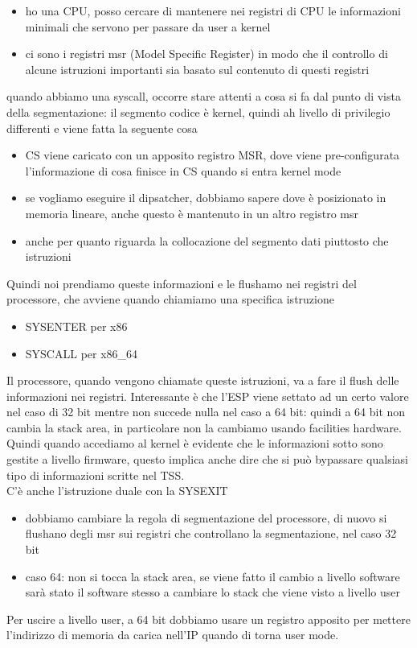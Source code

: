 \documentclass[12pt, oneside]{extbook}
\begin{document}
\begin{itemize}
\item ho una CPU, posso cercare di mantenere nei registri di CPU le informazioni minimali che servono per passare da user a kernel
\item ci sono i registri msr (Model Specific Register) in modo che il controllo di alcune istruzioni importanti sia basato sul contenuto di questi registri
\end{itemize}
quando abbiamo una syscall, occorre stare attenti a cosa si fa dal punto di vista della segmentazione: il segmento codice è kernel, quindi ah livello di privilegio differenti e viene fatta la seguente cosa
\begin{itemize}
\item CS viene caricato con un apposito registro MSR, dove viene pre-configurata l'informazione di cosa finisce in CS quando si entra kernel mode
\item se vogliamo eseguire il dipsatcher, dobbiamo sapere dove è posizionato in memoria lineare, anche questo è mantenuto in un altro registro msr
\item anche per quanto riguarda la collocazione del segmento dati piuttosto che istruzioni
\end{itemize}
Quindi noi prendiamo queste informazioni e le flushamo nei registri del processore, che avviene quando chiamiamo una specifica istruzione 
\begin{itemize}
\item SYSENTER per x86
\item SYSCALL per x86\_64
\end{itemize}
Il processore, quando vengono chiamate queste istruzioni, va a fare il flush delle informazioni nei registri. Interessante è che l'ESP viene settato ad un certo valore nel caso di 32 bit mentre non succede nulla nel caso a 64 bit: quindi a 64 bit non cambia la stack area, in particolare non la cambiamo usando facilities hardware. Quindi quando accediamo al kernel è evidente che le informazioni sotto sono gestite a livello firmware, questo implica anche dire che si può bypassare qualsiasi tipo di informazioni scritte nel TSS.\\ C'è anche l'istruzione duale con la SYSEXIT
\begin{itemize}
\item dobbiamo cambiare la regola di segmentazione del processore, di nuovo si flushano degli msr sui registri che controllano la segmentazione, nel caso 32 bit
\item caso 64: non si tocca la stack area, se viene fatto il cambio a livello software sarà stato il software stesso a cambiare lo stack che viene visto a livello user
\end{itemize}
Per uscire a livello user, a 64 bit dobbiamo usare un registro apposito per mettere l'indirizzo di memoria da carica nell'IP quando di torna user mode.
\end{document}
